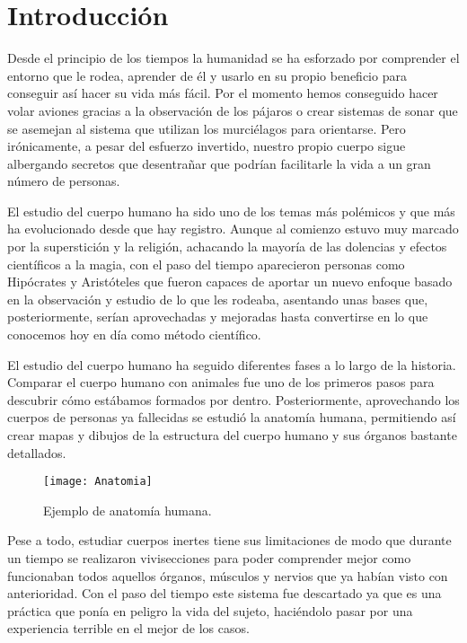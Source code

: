\chapter{Introducción\label{sec:introduccion}}

Desde el principio de los tiempos la humanidad se ha esforzado por comprender el entorno que le rodea, aprender de él y usarlo en su propio beneficio para conseguir así hacer su vida más fácil. Por el momento hemos conseguido hacer volar aviones gracias a la observación de los pájaros o crear sistemas de sonar que se asemejan al sistema que utilizan los murciélagos para orientarse. Pero irónicamente, a pesar del esfuerzo invertido, nuestro propio cuerpo sigue albergando secretos que desentrañar que podrían facilitarle la vida a un gran número de personas.

El estudio del cuerpo humano ha sido uno de los temas más polémicos y que más ha evolucionado desde que hay registro. Aunque al comienzo estuvo muy marcado por la superstición y la religión, achacando la mayoría de las dolencias y efectos científicos a la magia, con el paso del tiempo aparecieron personas como Hipócrates y Aristóteles que fueron capaces de aportar un nuevo enfoque basado en la observación y estudio de lo que les rodeaba, asentando unas bases que, posteriormente, serían aprovechadas y mejoradas hasta convertirse en lo que conocemos hoy en día como método científico.

El estudio del cuerpo humano ha seguido diferentes fases a lo largo de la historia. Comparar el cuerpo humano con animales fue uno de los primeros pasos para descubrir cómo estábamos formados por dentro. Posteriormente, aprovechando los cuerpos de personas ya fallecidas se estudió la anatomía humana, permitiendo así crear mapas y dibujos de la estructura del cuerpo humano y sus órganos bastante detallados.

\begin{figure} [H]
    \centering
    \texttt{[image: Anatomia]}
    \caption{Ejemplo de anatomía humana.}
    \label{fig:Anatomia}
\end{figure}

Pese a todo, estudiar cuerpos inertes tiene sus limitaciones de modo que durante un tiempo se realizaron vivisecciones para poder comprender mejor como funcionaban todos aquellos órganos, músculos y nervios que ya habían visto con anterioridad. Con el paso del tiempo este sistema fue descartado ya que es una práctica que ponía en peligro la vida del sujeto, haciéndolo pasar por una experiencia terrible en el mejor de los casos.

